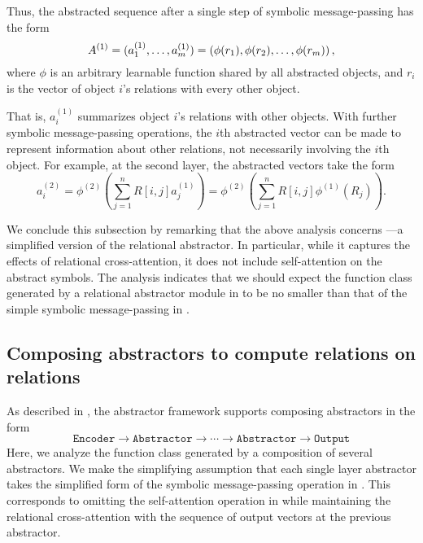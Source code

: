 Thus, the abstracted sequence after a single step of symbolic message-passing has the form
\begin{equation}
	\label{eq:abstracted_seq_1_layer_abstractor}
	A^{(1)} = (a_1^{(1)}, \ldots, a_m^{(1)}) = \left(\phi(r_1), \phi(r_2), \ldots, \phi(r_m)\right),
\end{equation}
where \(\phi\) is an arbitrary learnable function shared by all abstracted objects, and \(r_i\) is the vector of object \(i\)'s relations with every other object.

That is, \(a_i^{(1)}\) summarizes object \(i\)'s relations with other objects. With further symbolic message-passing operations, the \(i\)th abstracted vector can be made to represent information about other relations, not necessarily involving the \(i\)th object. For example, at the second layer, the abstracted vectors take the form
\begin{equation}
	a_i^{(2)} = \phi^{(2)} \left( \sum_{j=1}^{n} R[i,j] a_j^{(1)} \right) = \phi^{(2)} \left( \sum_{j=1}^{n} R[i,j] \phi^{(1)}(R_j) \right).
\end{equation}

We conclude this subsection by remarking that the above analysis concerns ---a simplified version of the relational abstractor. In particular, while it captures the effects of relational cross-attention, it does not include self-attention on the abstract symbols. The analysis indicates that we should expect the function class generated by a relational  abstractor module in  to be no smaller than that of the simple symbolic message-passing in .


\subsection{Composing  abstractors to compute relations on relations}
\label{ssec:compsing_abstractors}

As described in , the abstractor framework supports composing  abstractors in the form
\begin{equation*}
	\texttt{Encoder} \to \texttt{Abstractor} \to \cdots \to \texttt{Abstractor} \to \texttt{Output}
\end{equation*}
Here, we analyze the function class generated by a composition of several abstractors. We make the simplifying assumption that each single layer abstractor takes the simplified form of the symbolic message-passing operation in . This corresponds to omitting the self-attention operation in  while maintaining the relational cross-attention with the sequence of output vectors at the previous  abstractor.

